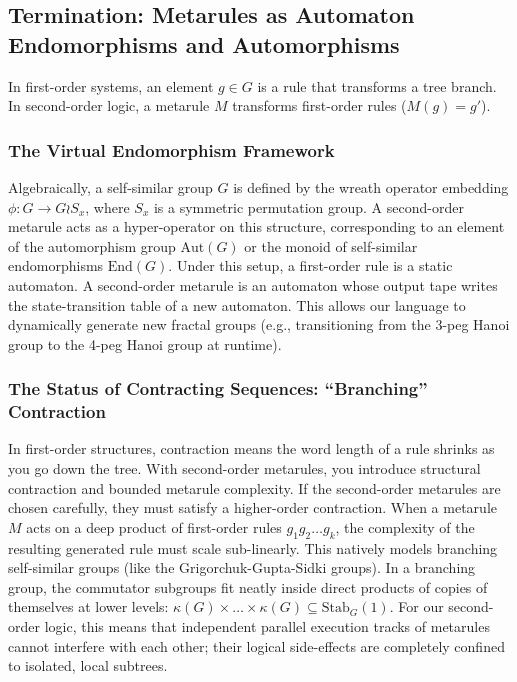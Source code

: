\documentclass[twocolumn]{article}
\begin{document}
\subsection{Termination: Metarules as Automaton Endomorphisms and Automorphisms}
In first-order systems, an element $g \in G$ is a rule that transforms a tree branch. In second-order logic, a metarule $M$ transforms first-order rules ($M(g) = g'$).

\subsubsection{The Virtual Endomorphism Framework}
Algebraically, a self-similar group $G$ is defined by the wreath operator embedding $\phi: G \to G \wr S_x$, where $S_x$ is a symmetric permutation group. A second-order metarule acts as a hyper-operator on this structure, corresponding to an element of the automorphism group $\text{Aut}(G)$ or the monoid of self-similar endomorphisms $\text{End}(G)$. Under this setup, a first-order rule is a static automaton. A second-order metarule is an automaton whose output tape writes the state-transition table of a new automaton. This allows our language to dynamically generate new fractal groups (e.g., transitioning from the 3-peg Hanoi group to the 4-peg Hanoi group at runtime).

\subsubsection{The Status of Contracting Sequences: ``Branching'' Contraction}
In first-order structures, contraction means the word length of a rule shrinks as you go down the tree. With second-order metarules, you introduce structural contraction and bounded metarule complexity. If the second-order metarules are chosen carefully, they must satisfy a higher-order contraction. When a metarule $M$ acts on a deep product of first-order rules $g_1 g_2 \dots g_k$, the complexity of the resulting generated rule must scale sub-linearly. This natively models branching self-similar groups (like the Grigorchuk-Gupta-Sidki groups). In a branching group, the commutator subgroups fit neatly inside direct products of copies of themselves at lower levels: $\kappa(G) \times \dots \times \kappa(G) \subseteq \text{Stab}_G(1)$. For our second-order logic, this means that independent parallel execution tracks of metarules cannot interfere with each other; their logical side-effects are completely confined to isolated, local subtrees.
\end{document}
